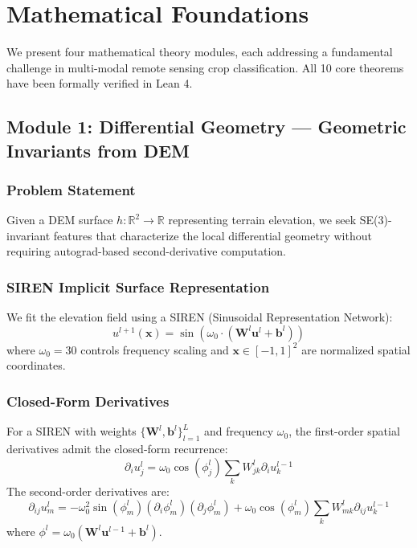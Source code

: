 \section{Mathematical Foundations}

We present four mathematical theory modules, each addressing a fundamental
challenge in multi-modal remote sensing crop classification. All 10 core
theorems have been formally verified in Lean 4.

\subsection{Module 1: Differential Geometry — Geometric Invariants from DEM}

\subsubsection{Problem Statement}

Given a DEM surface $h: \mathbb{R}^2 \to \mathbb{R}$ representing terrain
elevation, we seek SE(3)-invariant features that characterize the local
differential geometry without requiring autograd-based second-derivative
computation.

\subsubsection{SIREN Implicit Surface Representation}

We fit the elevation field using a SIREN (Sinusoidal Representation Network):
\begin{equation}
    u^{l+1}(\mathbf{x}) = \sin(\omega_0 \cdot (\mathbf{W}^l \mathbf{u}^l + \mathbf{b}^l))
\end{equation}
where $\omega_0 = 30$ controls frequency scaling and $\mathbf{x} \in [-1,1]^2$
are normalized spatial coordinates.

\subsubsection{Closed-Form Derivatives}

\begin{theorem}\label{thm:siren-grad}
For a SIREN with weights $\{\mathbf{W}^l, \mathbf{b}^l\}_{l=1}^{L}$ and
frequency $\omega_0$, the first-order spatial derivatives admit the closed-form
recurrence:
\begin{equation}\label{eq:siren-grad}
    \partial_i u_j^l = \omega_0 \cos(\phi_j^l) \sum_k W_{jk}^l \partial_i u_k^{l-1}
\end{equation}
The second-order derivatives are:
\begin{equation}\label{eq:siren-hess}
    \partial_{ij} u_m^l = -\omega_0^2 \sin(\phi_m^l)(\partial_i \phi_m^l)(\partial_j \phi_m^l)
    + \omega_0 \cos(\phi_m^l) \sum_k W_{mk}^l \partial_{ij} u_k^{l-1}
\end{equation}
where $\phi^l = \omega_0(\mathbf{W}^l \mathbf{u}^{l-1} + \mathbf{b}^l)$.
\end{theorem}

